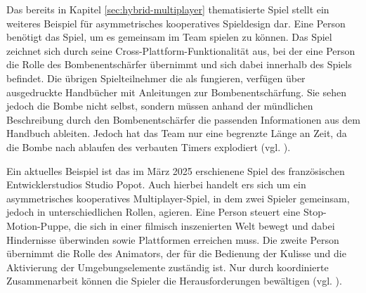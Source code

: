 Das bereits in Kapitel \ref{sec:hybrid-multiplayer} thematisierte Spiel  stellt ein weiteres Beispiel für asymmetrisches kooperatives Spieldesign dar. Eine Person benötigt das Spiel, um es gemeinsam im Team spielen zu können. Das Spiel zeichnet sich durch seine Cross-Plattform-Funktionalität aus, bei der eine Person die Rolle des Bombenentschärfer übernimmt und sich dabei innerhalb des Spiels befindet. Die übrigen Spielteilnehmer die als  fungieren, verfügen über ausgedruckte Handbücher mit Anleitungen zur Bombenentschärfung. Sie sehen jedoch die Bombe nicht selbst, sondern müssen anhand der mündlichen Beschreibung durch den Bombenentschärfer die passenden Informationen aus dem Handbuch ableiten. Jedoch hat das Team nur eine begrenzte Länge an Zeit, da die Bombe nach ablaufen des verbauten Timers explodiert (vgl. \citealp{steel_crate_games_keep_2015}).

Ein aktuelles Beispiel ist das im März 2025 erschienene Spiel  des französischen Entwicklerstudios Studio Popot. Auch hierbei handelt ers sich um ein asymmetrisches kooperatives Multiplayer-Spiel, in dem zwei Spieler gemeinsam, jedoch in unterschiedlichen Rollen, agieren. Eine Person steuert eine Stop-Motion-Puppe, die sich in einer filmisch inszenierten Welt bewegt und dabei Hindernisse überwinden sowie Plattformen erreichen muss. Die zweite Person übernimmt die Rolle des Animators, der für die Bedienung der Kulisse und die Aktivierung der Umgebungselemente zuständig ist. Nur durch koordinierte Zusammenarbeit können die Spieler die Herausforderungen bewältigen (vgl. \citealp{studio_popote_myrmidon_2025}).
